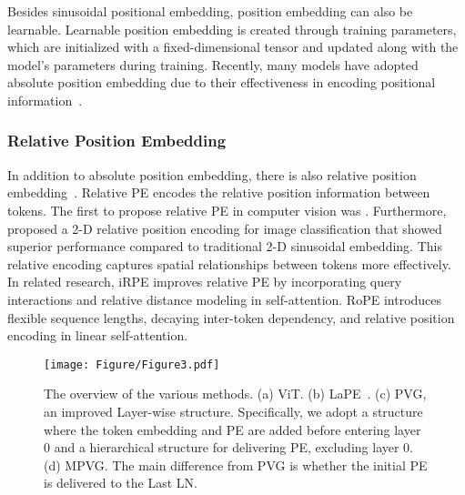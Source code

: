 Besides sinusoidal positional embedding, position embedding can also be learnable. Learnable position embedding is created through training parameters, which are initialized with a fixed-dimensional tensor and updated along with the model's parameters during training. Recently, many models have adopted absolute position embedding due to their effectiveness in encoding positional information~\cite{vit, DeiT, swin}.

\subsubsection{Relative Position Embedding} In addition to absolute position embedding, there is also relative position embedding~\cite{rpe}. Relative PE encodes the relative position information between tokens. The first to propose relative PE in computer vision was \cite{rpe}. Furthermore, \cite{2drpe} proposed a 2-D relative position encoding for image classification that showed superior performance compared to traditional 2-D sinusoidal embedding. This relative encoding captures spatial relationships between tokens more effectively. In related research, iRPE \cite{irpe} improves relative PE by incorporating query interactions and relative distance modeling in self-attention. RoPE \cite{rope} introduces flexible sequence lengths, decaying inter-token dependency, and relative position encoding in linear self-attention.

\begin{figure*}[t]
\centering
\texttt{[image: Figure/Figure3.pdf]}
\caption{The overview of the various methods. (a) ViT. (b) LaPE~\cite{lape}. (c) PVG, an improved Layer-wise structure. Specifically, we adopt a structure where the token embedding and PE are added before entering layer 0 and a hierarchical structure for delivering PE, excluding layer 0. (d) MPVG. The main difference from PVG is whether the initial PE is delivered to the Last LN.} \label{Figure3}

\end{figure*}